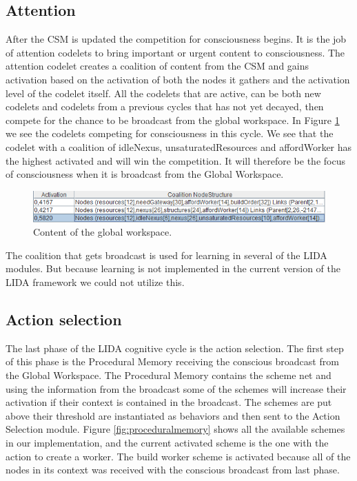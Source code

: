 \subsection{Attention}
After the CSM is updated the competition for consciousness begins. It is the job of attention codelets to bring important or urgent content to consciousness. The attention codelet creates a coalition of content from the CSM and gains activation based on the activation of both the nodes it gathers and the activation level of the codelet itself. All the codelets that are active, can be both new codelets and codelets from a previous cycles that has not yet decayed, then compete for the chance to be broadcast from the global workspace. In Figure \ref{fig:workspace} we see the codelets competing for consciousness in this cycle. We see that the codelet with a coalition of idleNexus, unsaturatedResources and affordWorker has the highest activated and will win the competition. It will therefore be the focus of consciousness when it is broadcast from the Global Workspace. 

\begin{figure}[h!tb]
\centering
\includegraphics[width=\textwidth]{graphics/global_workspace.png}
\caption{Content of the global workspace.}
\label{fig:workspace}
\end{figure}

The coalition that gets broadcast is used for learning in several of the LIDA modules. But because learning is not implemented in the current version of the LIDA framework we could not utilize this. 

\subsection{Action selection}
\label{sec:action_selection}
The last phase of the LIDA cognitive cycle is the action selection. The first step of this phase is the Procedural Memory receiving the conscious broadcast from the Global Workspace. The Procedural Memory contains the scheme net and using the information from the broadcast some of the schemes will increase their activation if their context is contained in the broadcast. The schemes are put above their threshold are instantiated as behaviors and then sent to the Action Selection module. Figure \ref{fig:proceduralmemory} shows all the available schemes in our implementation, and the current activated scheme is the one with the action to create a worker. The build worker scheme is activated because all of the nodes in its context was received with the conscious broadcast from last phase. 

